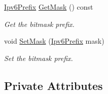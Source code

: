 \begin{DoxyCompactItemize}
\hyperlink{classns3_1_1Ipv6Prefix}{Ipv6\+Prefix} \hyperlink{classns3_1_1Ipv6AutoconfiguredPrefix_a64b720deeec085a8754cf84b5e5edeb7}{Get\+Mask} () const 
\begin{DoxyCompactList}\small\item\em Get the bitmask prefix. \end{DoxyCompactList}\item 
void \hyperlink{classns3_1_1Ipv6AutoconfiguredPrefix_a758838b803855b79b1d660756a312ecd}{Set\+Mask} (\hyperlink{classns3_1_1Ipv6Prefix}{Ipv6\+Prefix} mask)
\begin{DoxyCompactList}\small\item\em Set the bitmask prefix. \end{DoxyCompactList}\end{DoxyCompactItemize}
\subsection*{Private Attributes}
